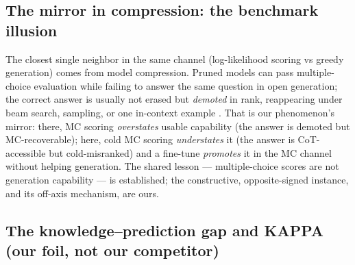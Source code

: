 \subsection{The mirror in compression: the benchmark illusion}
\label{related:benchillusion}

The closest single neighbor in the same channel (log-likelihood scoring vs greedy
generation) comes from model compression. Pruned models can pass multiple-choice
evaluation while failing to answer the same question in open generation; the correct
answer is usually not erased but \emph{demoted} in rank, reappearing under beam
search, sampling, or one in-context example \citep{BenchmarkIllusion}. That is our
phenomenon's mirror: there, MC scoring \emph{overstates} usable capability (the
answer is demoted but MC-recoverable); here, cold MC scoring \emph{understates} it
(the answer is CoT-accessible but cold-misranked) and a fine-tune \emph{promotes} it
in the MC channel without helping generation. The shared lesson --- multiple-choice
scores are not generation capability --- is established; the constructive,
opposite-signed instance, and its off-axis mechanism, are ours.

\subsection{The knowledge--prediction gap and KAPPA (our foil, not our
competitor)}\label{related:kappa}

